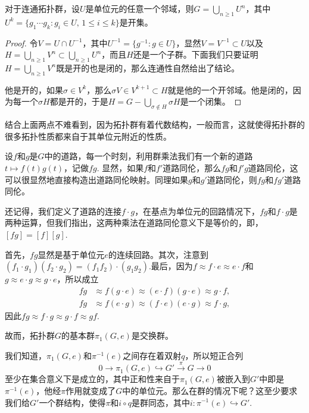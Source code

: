 \begin{pro}
对于连通拓扑群，设$U$是单位元的任意一个邻域，则$G=\bigcup_{n\geq 1}U^n$，其中$U^k=\{g_1\cdots g_k:g_i\in U,\, 1\leq i \leq k\}$是开集。
\end{pro}

\begin{proof}
令$V=U\cap U^{-1}$，其中$U^{-1}=\{g^{-1}:g\in U\}$，显然$V=V^{-1}\subset U$以及$H=\bigcup_{n\geq 1}V^n\subset \bigcup_{n\geq 1}U^n$，而且$H$还是一个子群。下面我们只要证明$H=\bigcup_{n\geq 1}V^n$既是开的也是闭的，那么连通性自然给出了结论。

他是开的，如果$\sigma\in V^k$，那么$\sigma V\in V^{k+1}\subset H$就是他的一个开邻域。他是闭的，因为每一个$\sigma H$都是开的，于是$H=G-\bigcup_{\sigma\notin H}\sigma H$是一个闭集。
\end{proof}

结合上面两点不难看到，因为拓扑群有着代数结构，一般而言，这就使得拓扑群的很多拓扑性质都来自于其单位元附近的性质。

\para 设$f$和$g$是$G$中的道路，每一个时刻，利用群乘法我们有一个新的道路$t\mapsto f(t)g(t)$，记做$fg$. 显然，如果$f$和$f'$道路同伦，那么$fg$和$f'g$道路同伦，这可以很显然地直接构造出道路同伦映射。同理如果$g$和$g'$道路同伦，则$fg$和$fg'$道路同伦。

还记得，我们定义了道路的连接$f\cdot g$，在基点为单位元的回路情况下，$fg$和$f\cdot g$是两种运算，但我们指出，这两种乘法在道路同伦意义下是等价的，即，$[fg]=[f][g]$.

首先，$fg$显然是基于单位元$e$的连续回路。其次，注意到$(f_1\cdot g_1)(f_2\cdot g_2)=(f_1f_2)\cdot (g_1g_2)$.最后，因为$f \approx f\cdot e \approx e\cdot f$和$g\approx e\cdot g \approx g\cdot e$，所以成立
\[
\begin{split}
	fg&\approx f(g\cdot e)\approx (e\cdot f)(g\cdot e) \approx g\cdot f,\\
	fg&\approx f(e\cdot g)\approx (f\cdot e)(e\cdot g) \approx f\cdot g,
\end{split}
\]
因此$fg \approx f\cdot g\approx g\cdot f \approx gf$.

\para 故而，拓扑群$G$的基本群$\pi_1(G,e)$是交换群。\endpara

\para 我们知道，$\pi_1(G,e)$和$\pi^{-1}(e)$之间存在着双射$q$，所以短正合列
\[
	0\to \pi_1(G,e)\hookrightarrow G' \xrightarrow{\pi} G\to 0
\]
至少在集合意义下是成立的，其中正和性来自于$\pi_1(G,e)$被嵌入到$G'$中即是$\pi^{-1}(e)$，他经$\pi$作用就变成了$G$中的单位元。那么在群的情况下呢？这至少要求我们给$G'$一个群结构，使得$\pi$和$i\circ q$是群同态，其中$i:\pi^{-1}(e)\hookrightarrow G'$. \endpara

